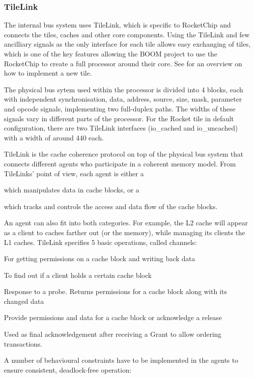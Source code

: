 \documentclass[journal,a4paper]{IEEEtran}
\begin{document}
\subsubsection{TileLink}
The internal bus system uses TileLink\cite{tilelink}, which is specific to RocketChip and connects the tiles, caches and other core components.
Using the TileLink and few ancilliary signals as the only interface for each tile allows easy exchanging of tiles, which is one of the key features allowing the BOOM project to use the RocketChip to create a full processor around their core.
See \cite{rcgen-tutorial} for an overview on how to implement a new tile.

The physical bus sytem used within the processor is divided into 4 blocks, each with independent synchronisation, data, address, source, size, mask, parameter and opcode signals, implementing two full-duplex paths.
The widths of these signals vary in different parts of the processor. For the Rocket tile in default configuration, there are two TileLink interfaces (io\_cached and io\_uncached) with a width of around 440 each.

TileLink is the cache coherence protocol on top of the physical bus system that connects different agents who participate in a coherent memory model. From TileLinks' point of view, each agent is either a

\begin{description}
	\item[\texttt{Client}] which manipulates data in cache blocks, or a
	\item[\texttt{Manager}] which tracks and controls the access and data flow of the cache blocks.
\end{description}
An agent can also fit into both categories. For example, the L2 cache will appear as a client to caches farther out (or the memory), while managing its clients the L1 caches.
TileLink specifies 5 basic operations, called channels:
\begin{description}
		\label{tilelink-channels}
	\item[\texttt{Acquire}] For getting permissions on a cache block and writing back data
	\item[\texttt{Probe}] To find out if a client holds a certain cache block
	\item[\texttt{Release}] Response to a probe. Returns permissions for a cache block along with its changed data
	\item[\texttt{Grant}] Provide permissions and data for a cache block or acknowledge a release
	\item[\texttt{Finish}] Used as final acknowledgement after receiving a Grant to allow ordering transactions.
\end{description}
A number of behavioural constraints have to be implemented in the agents to ensure consistent, deadlock-free operation:
\end{document}
